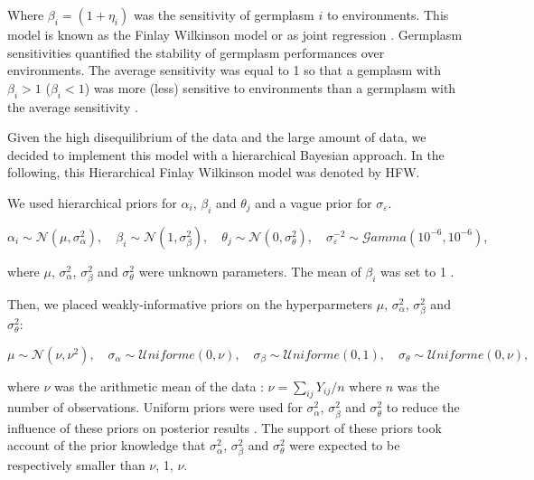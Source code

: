 \documentclass{article}\usepackage[]{graphicx}\usepackage[]{color}
\begin{document}
Where $\beta_{i} = (1 + \eta_{i})$ was the sensitivity of germplasm $i$ to environments.
This model is known as the Finlay Wilkinson model or as joint regression \citep{finlay_analysis_1963}.
Germplasm sensitivities quantified the stability of germplasm performances over environments.
The average sensitivity was equal to 1 so that a gemplasm with $\beta_{i} > 1$ ($\beta_{i} < 1$) was more (less) sensitive to environments than a germplasm with the average sensitivity \citep{nabugoomu_analysis_1999}.

Given the high disequilibrium of the data and the large amount of data, we decided to implement this model with a hierarchical Bayesian approach.
In the following, this Hierarchical Finlay Wilkinson model was denoted by HFW.

We used hierarchical priors for $\alpha_i$, $\beta_i$ and $\theta_j$ and a vague prior for $\sigma_{\varepsilon}$.

\begin{displaymath}
\alpha_{i} \sim \mathcal{N} (\mu,\sigma^2_{\alpha}), \quad 
\beta_{i} \sim \mathcal{N} (1,\sigma^2_{\beta}), \quad 
\theta_{j} \sim \mathcal{N} (0,\sigma^2_{\theta}), \quad 
\sigma^{-2}_{\varepsilon} \sim \mathcal{G}amma (10^{-6},10^{-6}),
\end{displaymath}

where $\mu$, $\sigma^2_{\alpha}$, $\sigma^2_{\beta}$ and $\sigma^2_{\theta}$ were unknown parameters.
The mean of $\beta_i$ was set to 1 \citep{nabugoomu_analysis_1999}.


Then, we placed weakly-informative priors on the hyperparmeters  $\mu$, $\sigma^2_{\alpha}$, $\sigma^2_{\beta}$ and $\sigma^2_{\theta}$:

\begin{displaymath}
\mu \sim \mathcal{N} (\nu,\nu^2), \quad 
\sigma_{\alpha} \sim \mathcal{U}niforme (0,\nu), \quad 
\sigma_{\beta} \sim \mathcal{U}niforme (0,1), \quad 
\sigma_{\theta} \sim \mathcal{U}niforme (0,\nu),
\end{displaymath}

where $\nu$ was the arithmetic mean of the data : $\nu = \sum_{ij} {Y_{ij}/n}$ where $n$ was the number of observations.
Uniform priors were used for $\sigma^2_{\alpha}$, $\sigma^2_{\beta}$ and $\sigma^2_{\theta}$ to reduce the influence of these priors on posterior results \citep{gelman__2006}.
The support of these priors took account of the prior knowledge that $\sigma^2_{\alpha}$, $\sigma^2_{\beta}$ and $\sigma^2_{\theta}$ were expected to be respectively smaller than $\nu$, 1, $\nu$. \\
\end{document}
